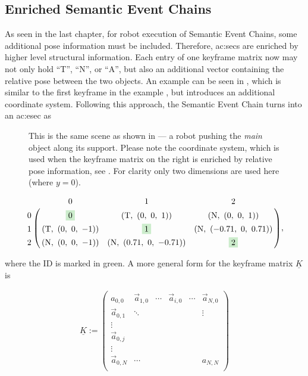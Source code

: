 \subsection{Enriched Semantic Event Chains}
\label{ssec:action_methods_enrichedsemanticeventchains}

As seen in the last chapter, for robot execution of Semantic Event Chains, some additional pose information must be included.
Therefore, \glspl{ac:sec} are enriched by higher level structural information.
Each entry of one keyframe matrix now may not only hold ``T'', ``N'', or ``A'', but also an additional vector containing the relative pose between the two objects.
An example can be seen in , which is similar to the first keyframe in the example , but introduces an additional coordinate system.
Following this approach, the Semantic Event Chain turns into an \gls{ac:esec} as

\begin{figure}
  \centering
  
  \caption{This is the same scene as shown in  --- a robot pushing the \emph{main} object along its support. Please note the coordinate system, which is used when the keyframe matrix on the right is enriched by relative pose information, see . For clarity only two dimensions are used here (where $y=0$).}
  \label{fig:sec_examplescenario_pushing_firstkeyframe}
\end{figure}

\begin{align}
  \bordermatrix{
    & 0 & 1 & 2\cr
    0 & \colorbox{green120}{0}    & (\textup{T},~(0,~0,~1))         & (\textup{N},~(0,~0,~1))\cr
    1 & (\textup{T},~(0,~0,~-1))  & \colorbox{green120}{1}          & (\textup{N},~(-0.71,~0,~0.71))\cr
    2 & (\textup{N},~(0,~0,~-1))  & (\textup{N},~(0.71,~0,~-0.71))  & \colorbox{green120}{2}\cr
    },
  \label{eqn:sec_enriched_2d}
\end{align}

where the ID is marked in green.
A more general form for the keyframe matrix $\underline{K}$ is

\begin{align}
  \underline{K} := \begin{pmatrix}
    a_{0,0}         & \vec{a}_{1,0} & \cdots & \vec{a}_{i,0}    & \cdots & \vec{a}_{N,0}\\
    \vec{a}_{0,1}   & \ddots        &        &                  &        & \vdots\\
    \vdots          &               &        &                  &        &\\
    \vec{a}_{0,j}   &               &        &                  &        &\\
    \vdots          &               &        &                  &        &\\
    \vec{a}_{0,N}   & \cdots        &        &                  &        & a_{N,N}\\
  \end{pmatrix}
  \label{eqn:sec_enriched_general}
\end{align}

